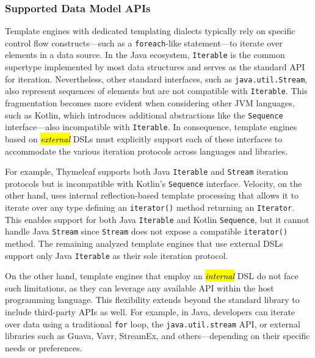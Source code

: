 \documentclass[software,article,accept,pdftex,moreauthors]{Definitions/mdpi}
\begin{document}

\subsubsection{Supported Data Model APIs}\label{s2.1.2}

Template engines with dedicated templating dialects typically rely on specific
control flow constructs---such as a \texttt{foreach}-like statement---to iterate
over elements in a data source. In the Java ecosystem, \texttt{Iterable} is the
common supertype implemented by most data structures and serves as the standard
API for iteration. Nevertheless, other standard interfaces, such as
\texttt{java.util.Stream}, also represent sequences of elements but are not
compatible with \texttt{Iterable}. This fragmentation becomes more evident when
considering other JVM languages, such as Kotlin, which introduces additional
abstractions like the \texttt{Sequence} interface---also incompatible with
\texttt{Iterable}. In consequence, template engines based on \textit{\hl{external}}
DSLs must explicitly support each of these interfaces to accommodate the
various iteration protocols across languages and libraries.

For example, Thymeleaf supports both Java \texttt{Iterable} and \texttt{Stream}
iteration protocols but is incompatible with Kotlin's \texttt{Sequence}
interface.
Velocity, on the other hand, uses internal reflection-based template processing
that allows it to iterate over any type defining an \texttt{iterator()} method
returning an \texttt{Iterator}. This enables support for both Java
\texttt{Iterable} and Kotlin \texttt{Sequence}, but it cannot handle Java
\texttt{Stream} since \texttt{Stream} does not expose a compatible
\texttt{iterator()} method.
The remaining analyzed template engines that use external DSLs support only Java
\texttt{Iterable} as their sole iteration protocol.

On the other hand, template engines that employ an \textit{\hl{internal}} DSL do not
face such limitations, as they can leverage any available API within the host
programming language. This flexibility extends beyond the standard library to
include third-party APIs as well. For example, in Java, developers can iterate
over data using a traditional \texttt{for} loop, the \texttt{java.util.stream}
API, or external libraries such as Guava, Vavr, StreamEx, and \mbox{others---depending}
on their specific needs or preferences.
\end{document}
